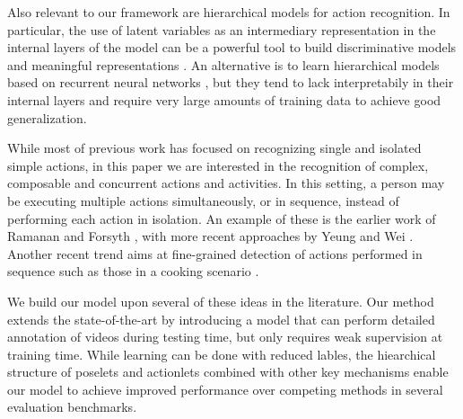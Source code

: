 Also relevant to our framework are hierarchical models for action
recognition. In particular, the use of latent variables as an intermediary
representation in the internal layers of the model can be a powerful
tool to build discriminative models and meaningful representations
\cite{Hu2014, Wang2008}. An alternative is to learn hierarchical models
based on recurrent neural networks \cite{YongDu2015}, but they tend to lack
interpretabily in their internal layers and require very large amounts
of training data to achieve good generalization.


While most of previous work has focused on recognizing single and isolated
simple actions, in this paper we are interested in the recognition
of complex, composable and concurrent actions
and activities. In this setting, a person may be executing multiple actions
simultaneously, or in sequence, instead of performing each action in isolation.
An example of these is the earlier work of Ramanan and Forsyth \cite{Ramanan2003},
with more recent approaches by Yeung \etal \cite{Yeung2015} and
Wei \etal \cite{Wei2013}.
Another recent trend aims at fine-grained detection of actions performed in sequence
such as those in a cooking scenario \cite{Rohrbach2012, Lan2015}.

We build our model upon several of these ideas in the literature. Our method
extends the state-of-the-art by introducing a model that can perform
detailed annotation of videos during testing time, but only requires weak
supervision at training time. While learning can be done with
reduced lables, the hiearchical structure of poselets and actionlets combined
with other key mechanisms enable our model to achieve improved
performance over competing methods in several evaluation benchmarks.
